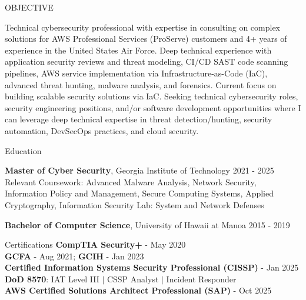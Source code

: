 \documentclass{resume} %
\begin{document}

\begin{rSection}{OBJECTIVE}

{Technical cybersecurity professional with expertise in consulting on complex solutions for AWS Professional Services (ProServe) customers and 4+ years of experience in the United States Air Force. Deep technical experience with application security reviews and threat modeling, CI/CD SAST code scanning pipelines, AWS service implementation via Infrastructure-as-Code (IaC), advanced threat hunting, malware analysis, and forensics. Current focus on building scalable security solutions via IaC. Seeking technical cybersecurity roles, security engineering positions, and/or software development opportunities where I can leverage deep technical expertise in threat detection/hunting, security automation, DevSecOps practices, and cloud security.}


\end{rSection}

\begin{rSection}{Education}

{\bf Master of Cyber Security}, Georgia Institute of Technology \hfill {2021 - 2025}\\
Relevant Coursework: Advanced Malware Analysis, Network Security, Information Policy and Management, Secure Computing Systems, Applied Cryptography, Information Security Lab: System and Network Defenses

{\bf Bachelor of Computer Science}, University of Hawaii at Manoa \hfill {2015 - 2019}

\end{rSection}

\begin{rSection}{Certifications}
{\bf CompTIA Security+} - May 2020 \\
{\bf GCFA} - Aug 2021; {\bf GCIH} - Jan 2023 \\
{\bf Certified Information Systems Security Professional (CISSP)} - Jan 2025 \\
{\bf DoD 8570}: IAT Level III $|$ CSSP Analyst $|$ Incident Responder \\ 
{\bf AWS Certified Solutions Architect Professional (SAP)} - Oct 2025 
\end{rSection}
\end{document}
